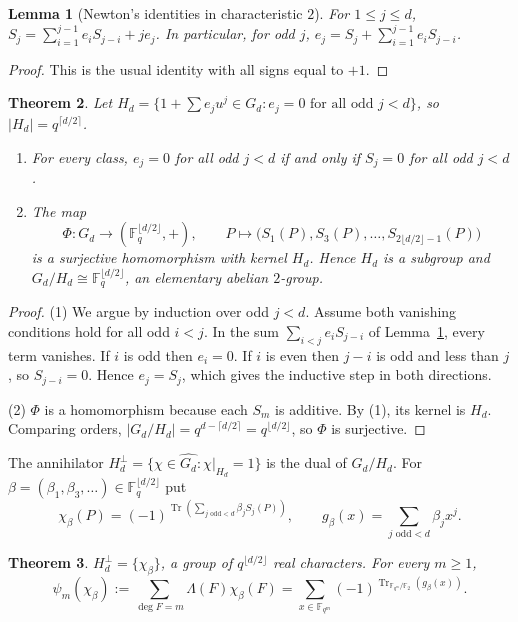 \documentclass[11pt,a4paper]{amsart}
\newtheorem{theorem}{Theorem}[section]
\newtheorem{lemma}[theorem]{Lemma}
\theoremstyle{definition}
\theoremstyle{remark}
\newcommand{\F}{\mathbb{F}}
\newcommand{\Tr}{\operatorname{Tr}}
\begin{document}
\begin{lemma}[Newton's identities in characteristic $2$]\label{lem:newton}
For $1\le j\le d$, $S_j=\sum_{i=1}^{j-1}e_iS_{j-i}+je_j$. In particular, for odd $j$,
$e_j=S_j+\sum_{i=1}^{j-1}e_iS_{j-i}$.
\end{lemma}

\begin{proof}
This is the usual identity with all signs equal to $+1$.
\end{proof}

\begin{theorem}\label{thm:group}
Let $H_d=\{1+\sum e_ju^j\in G_d: e_j=0\text{ for all odd }j<d\}$, so $|H_d|=q^{\lceil d/2\rceil}$.
\begin{enumerate}
\item For every class, $e_j=0$ for all odd $j<d$ if and only if $S_j=0$ for all odd $j<d$.
\item The map
\[
\Phi:G_d\to(\F_q^{\lfloor d/2\rfloor},+),\qquad P\mapsto\bigl(S_1(P),S_3(P),\dots,S_{2\lfloor d/2\rfloor-1}(P)\bigr)
\]
is a surjective homomorphism with kernel $H_d$. Hence $H_d$ is a subgroup and $G_d/H_d\cong\F_q^{\lfloor d/2\rfloor}$, an
elementary abelian $2$-group.
\end{enumerate}
\end{theorem}

\begin{proof}
(1) We argue by induction over odd $j<d$. Assume both vanishing conditions hold for all odd $i<j$. In the sum
$\sum_{i<j}e_iS_{j-i}$ of Lemma~\ref{lem:newton}, every term vanishes. If $i$ is odd then $e_i=0$. If $i$ is even then
$j-i$ is odd and less than $j$, so $S_{j-i}=0$. Hence $e_j=S_j$, which gives the inductive step in both directions.

(2) $\Phi$ is a homomorphism because each $S_m$ is additive. By (1), its kernel is $H_d$. Comparing orders,
$|G_d/H_d|=q^{d-\lceil d/2\rceil}=q^{\lfloor d/2\rfloor}$, so $\Phi$ is surjective.
\end{proof}

The annihilator $H_d^\perp=\{\chi\in\widehat{G_d}:\chi|_{H_d}=1\}$ is the dual of $G_d/H_d$. For
$\beta=(\beta_1,\beta_3,\dots)\in\F_q^{\lfloor d/2\rfloor}$ put
\[
\chi_\beta(P)=(-1)^{\Tr(\sum_{j\text{ odd}<d}\beta_jS_j(P))},\qquad
g_\beta(x)=\sum_{j\text{ odd}<d}\beta_jx^j .
\]

\begin{theorem}\label{thm:AS}
$H_d^\perp=\{\chi_\beta\}$, a group of $q^{\lfloor d/2\rfloor}$ real characters. For every $m\ge1$,
\[
\psi_m(\chi_\beta):=\sum_{\deg F=m}\Lambda(F)\chi_\beta(F)=\sum_{x\in\F_{q^m}}(-1)^{\Tr_{\F_{q^m}/\F_2}(g_\beta(x))}.
\]
\end{theorem}
\end{document}
